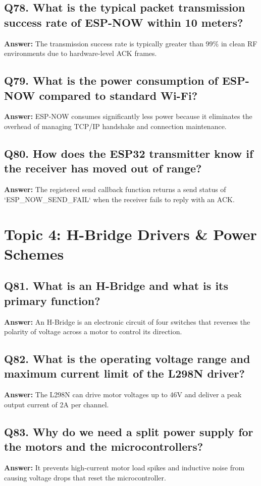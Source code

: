 \documentclass[12pt,a4paper,oneside]{report}
\begin{document}
\section{Q78. What is the typical packet transmission success rate of ESP-NOW within 10 meters?}
\textbf{Answer:} The transmission success rate is typically greater than 99\% in clean RF environments due to hardware-level ACK frames.

\section{Q79. What is the power consumption of ESP-NOW compared to standard Wi-Fi?}
\textbf{Answer:} ESP-NOW consumes significantly less power because it eliminates the overhead of managing TCP/IP handshake and connection maintenance.

\section{Q80. How does the ESP32 transmitter know if the receiver has moved out of range?}
\textbf{Answer:} The registered send callback function returns a send status of `ESP\_NOW\_SEND\_FAIL` when the receiver fails to reply with an ACK.

\chapter{Topic 4: H-Bridge Drivers \& Power Schemes}

\section{Q81. What is an H-Bridge and what is its primary function?}
\textbf{Answer:} An H-Bridge is an electronic circuit of four switches that reverses the polarity of voltage across a motor to control its direction.

\section{Q82. What is the operating voltage range and maximum current limit of the L298N driver?}
\textbf{Answer:} The L298N can drive motor voltages up to 46V and deliver a peak output current of 2A per channel.

\section{Q83. Why do we need a split power supply for the motors and the microcontrollers?}
\textbf{Answer:} It prevents high-current motor load spikes and inductive noise from causing voltage drops that reset the microcontroller.
\end{document}
